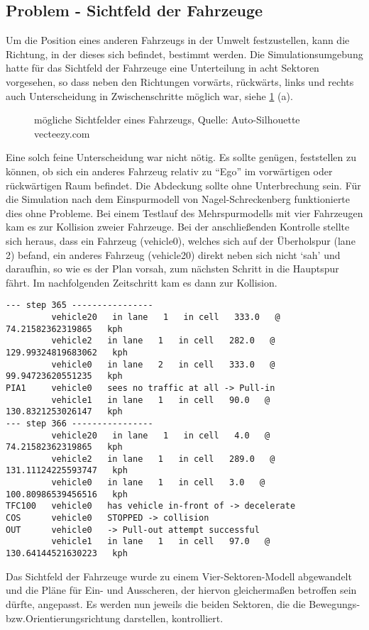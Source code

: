 \subsection{Problem - Sichtfeld der Fahrzeuge}

Um die Position eines anderen Fahrzeugs in der Umwelt festzustellen, kann die Richtung, in der dieses sich befindet, bestimmt werden.
Die Simulationsumgebung hatte für das Sichtfeld der Fahrzeuge eine Unterteilung in acht Sektoren vorgesehen, so dass neben den Richtungen vorwärts, rückwärts, links und rechts auch Unterscheidung in Zwischenschritte möglich war, siehe \cref{figure:car-view-sectors} (a).

\begin{figure}[hptb]
  \centering 
   \qquad 
   \qquad 
  \caption{mögliche Sichtfelder eines Fahrzeugs, Quelle: Auto-Silhouette vecteezy.com} 
  \label{figure:car-view-sectors}
\end{figure}

Eine solch feine Unterscheidung war nicht nötig.
Es sollte genügen, feststellen zu können, ob sich ein anderes Fahrzeug relativ zu \enquote{Ego} im vorwärtigen oder rückwärtigen Raum befindet. 
Die Abdeckung sollte ohne Unterbrechung sein.
Für die Simulation nach dem Einspurmodell von Nagel-Schreckenberg funktionierte dies ohne Probleme.
Bei einem Testlauf des Mehrspurmodells mit vier Fahrzeugen kam es zur Kollision zweier Fahrzeuge. 
Bei der anschließenden Kontrolle stellte sich heraus, dass ein Fahrzeug (vehicle0), welches sich auf der Überholspur (lane 2) befand, ein anderes Fahrzeug (vehicle20) direkt neben sich nicht \enquote*{sah} und daraufhin, so wie es der Plan vorsah, zum nächsten Schritt in die Hauptspur fährt. 
Im nachfolgenden Zeitschritt kam es dann zur Kollision.

\begin{verbatim}
--- step 365 ----------------
         vehicle20   in lane   1   in cell   333.0   @   74.21582362319865   kph
         vehicle2   in lane   1   in cell   282.0   @   129.99324819683062   kph
         vehicle0   in lane   2   in cell   333.0   @   99.94723620551235   kph
PIA1     vehicle0   sees no traffic at all -> Pull-in
         vehicle1   in lane   1   in cell   90.0   @   130.8321253026147   kph
--- step 366 ----------------
         vehicle20   in lane   1   in cell   4.0   @   74.21582362319865   kph
         vehicle2   in lane   1   in cell   289.0   @   131.11124225593747   kph
         vehicle0   in lane   1   in cell   3.0   @   100.80986539456516   kph
TFC100   vehicle0   has vehicle in-front of -> decelerate
COS      vehicle0   STOPPED -> collision
OUT      vehicle0   -> Pull-out attempt successful
         vehicle1   in lane   1   in cell   97.0   @   130.64144521630223   kph
\end{verbatim}

Das Sichtfeld der Fahrzeuge wurde zu einem Vier-Sektoren-Modell abgewandelt und die Pläne für Ein- und Ausscheren, der hiervon gleichermaßen betroffen sein dürfte, angepasst.
Es werden nun jeweils die beiden Sektoren, die die Bewegungs- bzw.Orientierungsrichtung darstellen, kontrolliert.